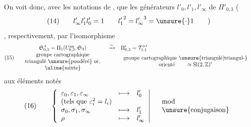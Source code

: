 On voit donc, avec les notations de \hspace{3em}, que les générateurs
$l'_0,l'_1,l'_\infty$ de $\Pi'_{0,3}$
(
\[
(14)\qquad l'_\infty l'_1 l'_0=1
\qquad {l'_1}^{2}={l'_\infty}^{3}=\unsure{\cdot}1\qquad )
\]
, respectivement, par l'isomorphisme
\[
(15)\quad
\begin{array}{ccl}
\mathfrak{S}_{0,3}^{+}
=\Pi_1(U_{0,3}^{\mathrm{an}},\mathfrak{S}_3)
&\xrightarrow{\sim}&\Pi'_{0,3}=\mathcal{T}_{1,1}^{+\prime}\\
\begin{array}{c}
\text{groupe cartographique}\\
\text{triangulé \unsure{pondéré} or.}\\
\text{\uline{mixte}}
\end{array}
&&\begin{array}{c}
\text{groupe cartographique \unsure{triangulé|triangul-}}\\
\text{orienté}\qquad \simeq\mathrm{Sl}(2,\mathbb{Z})'
\end{array}
\end{array}
\]
aux éléments notés
\[
(16)\qquad
\left\{\begin{array}{lll}
\varepsilon_0,\varepsilon_1,\varepsilon_\infty&\longmapsto&l'_0\\
\text{(tels que $\varepsilon_i^2=l_i$)}&&\\
\sigma_0,\sigma_1,\sigma_\infty&\longmapsto&l'_1\\
\rho&\longmapsto&l'_\infty
\end{array}\right|\quad
\begin{array}{l}\mathrm{mod}\\\text{\unsure{conjugaison}}\end{array}
\]



